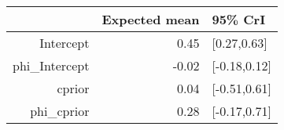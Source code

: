 \begin{tabular}{rrl}
  \hline
 & Expected mean & 95\% CrI \\ 
  \hline
Intercept & 0.45 & [0.27,0.63] \\ 
  phi\_Intercept & -0.02 & [-0.18,0.12] \\ 
  cprior & 0.04 & [-0.51,0.61] \\ 
  phi\_cprior & 0.28 & [-0.17,0.71] \\ 
   \hline
\end{tabular}


